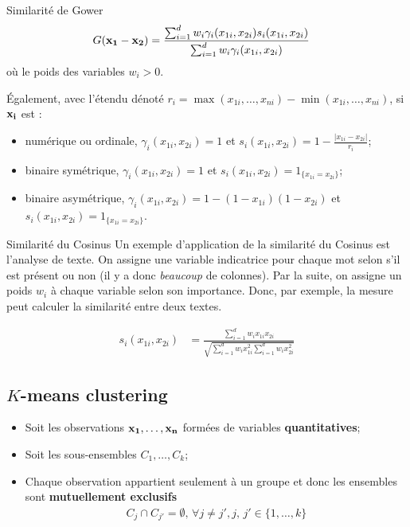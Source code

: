\documentclass[10pt, french]{article}
\begin{document}
\begin{multicols*}{3}
\begin{conceptgen}{Similarité de Gower}
\begin{align*}
	G(\mathbf{x_{1} - x_{2}})
	&=	\frac{\sum_{i = 1}^{d} w_{i} \gamma_{i} (x_{1i}, x_{2i}) s_{i}(x_{1i}, x_{2i})}{\sum_{i = 1}^{d} w_{i} \gamma_{i} (x_{1i}, x_{2i})}
\end{align*}
\setlength{\mathindent}{1cm}
où le poids des variables $w_{i} > 0$.

Également, avec l'étendu dénoté $r_{i} = \max(x_{1i}, \dots, x_{ni}) - \min(x_{1i}, \dots, x_{ni})$, si $\mathbf{x_{i}}$ est :

\begin{itemize}[leftmargin = *]
	\item	numérique ou ordinale, $\gamma_{i} (x_{1i}, x_{2i}) = 1$ et  $s_{i}(x_{1i}, x_{2i}) = 1 - \frac{|x_{1i} - x_{2i}|}{r_{i}}$;
	\item	binaire symétrique, $\gamma_{i} (x_{1i}, x_{2i}) = 1$ et  $s_{i}(x_{1i}, x_{2i}) = 1_{\{x_{1i} = x_{2i}\}}$;
	\item	binaire asymétrique, $\gamma_{i} (x_{1i}, x_{2i}) = 1 - (1 - x_{1i})(1 - x_{2i})$ et  $s_{i}(x_{1i}, x_{2i}) = 1_{\{x_{1i} = x_{2i}\}}$.
\end{itemize}
\end{conceptgen}

\begin{conceptgen}{Similarité du Cosinus}
Un exemple d'application de la similarité du Cosinus est l'analyse de texte. On assigne une variable indicatrice pour chaque mot selon s'il est présent ou non (il y a donc \textit{beaucoup} de colonnes). Par la suite, on assigne un poids $w_i$ à chaque variable selon son importance. Donc, par exemple, la mesure peut calculer la similarité entre deux textes.

\begin{align*}
	s_{i}(x_{1i}, x_{2i}) 
	&=	\frac{\sum_{i = 1}^{d} w_{i} x_{1i} x_{2i}}{\sqrt{\sum_{i = 1}^{d}w_{i}x_{1i}^{2}\sum_{i = 1}^{d} w_{i} x_{2i}^{2}}}
\end{align*}
\end{conceptgen}

\columnbreak

\subsection*{$K$-means clustering}
\begin{distributions}[Notation]
\begin{itemize}[leftmargin = *]
	\item	Soit les observations $\mathbf{x_{1}, \dots, x_{n}}$ formées de variables \textbf{quantitatives};
	\item	Soit les sous-ensembles $C_{1}, \dots, C_{k}$;
	\item	Chaque observation appartient seulement à un groupe et donc les ensembles sont \textbf{mutuellement exclusifs}
		\begin{align*}
		C_{j} \cap C_{j'} = \emptyset, \, \forall j \neq j', j, \, j' \in \{1, \dots, k\}
		\end{align*}
\end{itemize}
\end{distributions}


\end{multicols*}
\end{document}
